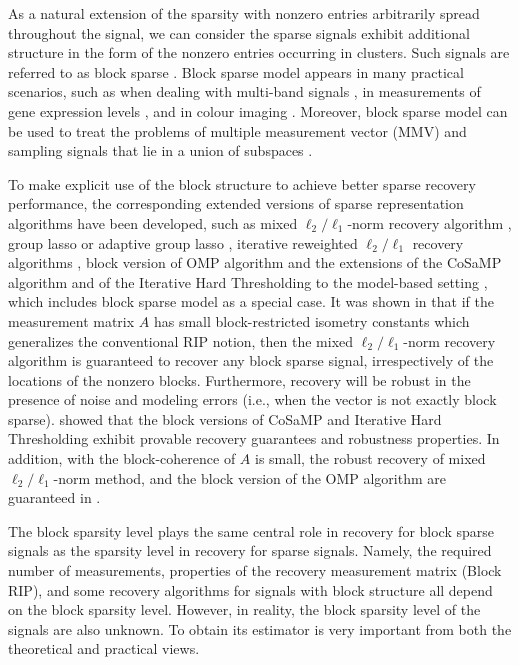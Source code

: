 \documentclass[journal,onecolumn]{IEEEtran}
\begin{document}
As a natural extension of the sparsity with nonzero entries arbitrarily spread throughout the signal, we can consider the sparse signals exhibit additional structure in the form of the nonzero entries occurring in clusters. Such signals are referred to as block sparse \cite{de,ekb,em}. Block sparse model appears in many practical scenarios, such as when dealing with multi-band signals \cite{me2}, in measurements of gene expression levels \cite{pvmh}, and in colour imaging \cite{mw}. Moreover, block sparse model can be used to treat the problems of multiple measurement vector (MMV) \cite{ch,crek,em,me1} and sampling signals that lie in a union of subspaces \cite{bd2,em,me2}.

To make explicit use of the block structure to achieve better sparse recovery performance, the corresponding extended versions of sparse representation
algorithms have been developed, such as mixed $\ell_2/\ell_1$-norm recovery algorithm \cite{ekb,em,sph}, group lasso \cite{yl} or adaptive group lasso \cite{lbw}, iterative reweighted $\ell_2/\ell_1$ recovery algorithms \cite{zb}, block version of OMP algorithm \cite{ekb} and the extensions of the CoSaMP algorithm and of the Iterative Hard Thresholding to the model-based setting \cite{bcdh}, which includes block sparse model as a special case. It was shown in \cite{em} that if the measurement matrix $A$ has small block-restricted isometry constants which generalizes the
conventional RIP notion, then the mixed $\ell_2/\ell_1$-norm recovery algorithm is guaranteed to recover any block sparse signal, irrespectively of the
locations of the nonzero blocks. Furthermore, recovery will be
robust in the presence of noise and modeling errors (i.e., when
the vector is not exactly block sparse). \cite{bcdh} showed that the block versions of CoSaMP and Iterative Hard Thresholding exhibit
provable recovery guarantees and robustness properties. In addition, with the block-coherence of $A$ is small, the robust recovery of mixed $\ell_2/\ell_1$-norm method, and the block version of the OMP algorithm are guaranteed in \cite{ekb}.

The block sparsity level plays the same central role in recovery for block sparse signals as the sparsity level in recovery for sparse signals. Namely, the required number of measurements, properties of the recovery measurement matrix (Block RIP), and some recovery algorithms for signals with block structure all depend on the block sparsity level. However, in reality, the block sparsity level of the signals are also unknown. To obtain its estimator is very important from both the theoretical and practical views.
\end{document}
